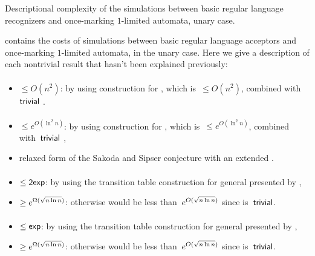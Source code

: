 \begin{table}
	\caption{Descriptional complexity of the simulations between basic regular language recognizers and once-marking $1$-limited automata, unary case.}
	\label{tab:sims-om-unary}
\end{table}

 contains the costs of simulations between basic regular language acceptors and once-marking $1$-limited automata, in the unary case.
Here we give a description of each nontrivial result that hasn't been explained previously:

\paragraph{\ONFA{}\tto\OMODLA}\label{cost:1NFAtoOM1DLAu}
\begin{itemize}
	\item $\le O(n^2)$: by using construction for \hyperref[cost:1NFAto2DFAu]{\ONFA{}\tto\TDFA}, which is~$\le O(n^2)$, combined with~$\mathsf{trivial}$ \TDFA{}\tto\OMODLA.
\end{itemize}
\paragraph{\TNFA{}\tto\OMODLA}
\begin{itemize}
	\item $\le e^{O(\ln^2n)}$: by using construction for \hyperref[cost:2NFAto2DFAu]{\TNFA{}\tto\TDFA}, which is~$\le e^{O(\ln^2n)}$, combined with~$\mathsf{trivial}$ \TDFA{}\tto\OMODLA,
	\item relaxed form of the Sakoda and Sipser conjecture with an extended \TDFA.
\end{itemize}
\paragraph{\OMOLA{}\tto\ODFA}
\begin{itemize}
	\item $\le\mathsf{2exp}$: by using the transition table construction for general \OLAs presented by ,
	\item $\ge e^{\Omega(\sqrt{n\ln n})}$: otherwise \hyperref[cost:2DFAto1DFAu]{\TDFA{}\tto\ODFA} would be less than~$e^{O(\sqrt{n\ln n})}$ since \TDFA{}\tto\OMOLA is~$\mathsf{trivial}$.
\end{itemize}
\paragraph{\OMOLA{}\tto\ONFA}\label{cost:OM1LAto1NFAu}
\begin{itemize}
	\item $\le\mathsf{exp}$: by using the transition table construction for general \OLAs presented by ,
	\item $\ge e^{\Omega(\sqrt{n\ln n})}$: otherwise \hyperref[cost:2DFAto1NFAu]{\TDFA{}\tto\ONFA} would be less than~$e^{O(\sqrt{n\ln n})}$ since \TDFA{}\tto\OMOLA is~$\mathsf{trivial}$.
\end{itemize}
